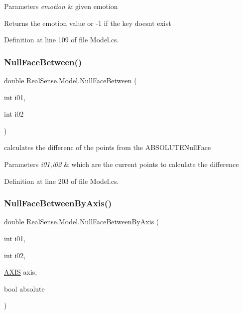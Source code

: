 \begin{DoxyParams}{Parameters}
{\em emotion} & given emotion \\
\hline
\end{DoxyParams}
\begin{DoxyReturn}{Returns}
the emotion value or -\/1 if the key doesn\textquotesingle{}t exist 
\end{DoxyReturn}


Definition at line 109 of file Model.\+cs.

\mbox{\label{class_real_sense_1_1_model_a03fd4fa56ceb5cbcebdbebb4b7a78158}} 
\subsubsection{\texorpdfstring{Null\+Face\+Between()}{NullFaceBetween()}}
{\footnotesize\ttfamily double Real\+Sense.\+Model.\+Null\+Face\+Between (\begin{DoxyParamCaption}\item[{int}]{i01,  }\item[{int}]{i02 }\end{DoxyParamCaption})}

calculates the differenc of the points from the A\+B\+S\+O\+L\+U\+T\+E\+Null\+Face 
\begin{DoxyParams}{Parameters}
{\em i01,i02} & which are the current points to calculate the difference \\
\hline
\end{DoxyParams}


Definition at line 203 of file Model.\+cs.

\mbox{\label{class_real_sense_1_1_model_aab86ce9f3027b3fca83d11a97353154c}} 
\subsubsection{\texorpdfstring{Null\+Face\+Between\+By\+Axis()}{NullFaceBetweenByAxis()}}
{\footnotesize\ttfamily double Real\+Sense.\+Model.\+Null\+Face\+Between\+By\+Axis (\begin{DoxyParamCaption}\item[{int}]{i01,  }\item[{int}]{i02,  }\item[{\hyperlink{class_real_sense_1_1_model_ab1d8b9992dae2162c48b52f6694f946b}{A\+X\+IS}}]{axis,  }\item[{bool}]{absolute }\end{DoxyParamCaption})}

